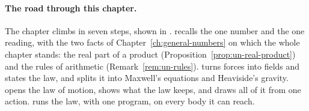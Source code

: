 \paragraph{The road through this chapter.}
The chapter climbs in seven steps, shown in .  recalls the one number and the one reading, with the two facts of Chapter~\ref{ch:general-numbers} on which the whole chapter stands: the real part of a product (Proposition~\ref{prop:un-real-product}) and the rules of arithmetic (Remark~\ref{rem:un-rules}).  turns forces into fields and states the law, and  splits it into Maxwell's equations and Heaviside's gravity.  opens the law of motion,  shows what the law keeps, and  draws all of it from one action.  runs the law, with one program, on every body it can reach.

